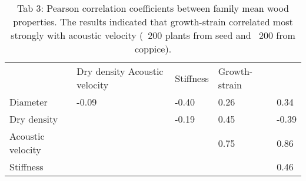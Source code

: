\begin{table}
\centering
\caption{Tab 3: Pearson correlation coefficients between family mean wood properties. The results indicated that growth-strain correlated most strongly with acoustic velocity (~200 plants from seed and ~200 from coppice).}
\label{my-label}
\begin{tabular}{lllll}
            & Dry density        Acoustic velocity & Stiffness & Growth-strain        \\
Diameter          & -0.09             & -0.40     & 0.26          & 0.34  \\
Dry density       &                   & -0.19     & 0.45          & -0.39 \\
Acoustic velocity &                   &           & 0.75          & 0.86  \\
Stiffness         &                   &           &               & 0.46 
\end{tabular}
\end{table}